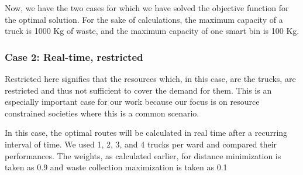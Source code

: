 \documentclass[12pt]{article}
\begin{document}
Now, we have the two cases for which we have solved the objective function for the optimal solution. For the sake of calculations, the maximum capacity of a truck is 1000 Kg of waste, and the maximum capacity of one smart bin is 100 Kg.

\subsubsection*{Case 2: Real-time, restricted}
Restricted here signifies that the resources which, in this case, are the trucks, are restricted and thus not sufficient to cover the demand for them. This is an especially important case for our work because our focus is on resource constrained societies where this is a common scenario.

In this case, the optimal routes will be calculated in real time after a recurring interval of time. We used 1, 2, 3, and 4 trucks per ward and compared their performances. The weights, as calculated earlier, for distance minimization is taken as 0.9 and waste collection maximization is taken as 0.1
\end{document}
